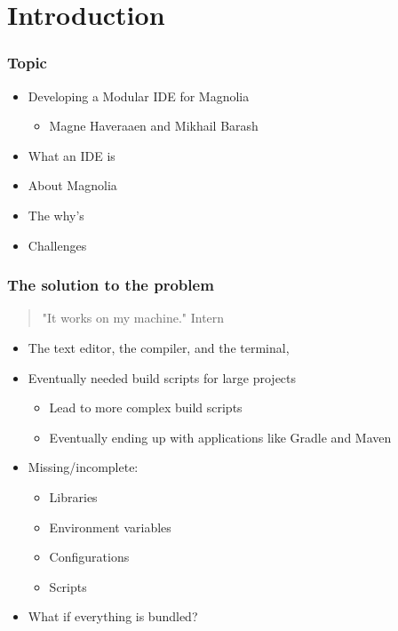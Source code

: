 \section{Introduction}
\SectionPage

\begin{frame}
  \frametitle{Topic}
  \begin{itemize}
    \item Developing a Modular IDE for Magnolia
    \pause
      \begin{itemize}
        \item Magne Haveraaen and Mikhail Barash
      \end{itemize}
    \pause
    \item What an IDE is
    \item About Magnolia
    \item The why's
    \item Challenges
  \end{itemize}
\end{frame}

\begin{frame}
  \frametitle{The solution to the problem}
  \begin{quote}
    "It works on my machine." \textemdash Intern
  \end{quote}
  \begin{itemize}
    \item The text editor, the compiler, and the terminal,
    \pause
    \item Eventually needed build scripts for large projects
    \begin{itemize}
      \item Lead to more complex build scripts
      \item Eventually ending up with applications like Gradle and Maven
    \end{itemize}
    \pause
    \item Missing/incomplete:
    \pause
    \begin{itemize}
      \item Libraries
      \item Environment variables
      \item Configurations
      \item Scripts
      \pause
    \end{itemize}
  \item What if everything is bundled?
  \end{itemize}
\end{frame}

